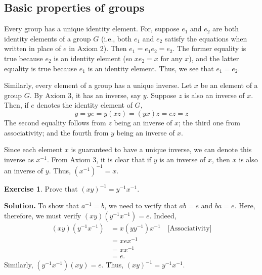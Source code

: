 \documentclass[svgnames]{article}
\theoremstyle{definition}
\newtheorem{Exercise}{Exercise}[section]
\theoremstyle{remark}
\begin{document}
\subsection{Basic properties of groups}\label{subsec:BasicProps}
Every group has a unique identity element. For, suppose $e_1$ and $e_2$ are both identity elements of a group $G$ (i.e., both $e_1$ and $e_2$ satisfy the equations when written in place of $e$ in Axiom 2). Then $e_1 = e_1 e_2 = e_2$. The former equality is true because $e_2$ is an identity element (so $x e_2 = x$ for any $x$), and the latter equality is true because $e_1$ is an identity element. Thus, we see that $e_1 = e_2$.

Similarly, every element of a group has a unique inverse. Let $x$ be an element of a group $G$. By Axiom 3, it has an inverse, say $y$. Suppose $z$ is also an inverse of $x$. Then, if $e$ denotes the identity element of $G$,
\begin{equation*}
y = ye = y(xz) = (yx)z = ez = z
\end{equation*}
The second equality follows from $z$ being an inverse of $x$; the third one from associativity; and the fourth from $y$ being an inverse of $x$.

\label{def:Inverse} Since each element $x$ is guaranteed to have a unique inverse, we can denote this inverse as $x^{-1}$. From Axiom 3, it is clear that if $y$ is an inverse of $x$, then $x$ is also an inverse of $y$. Thus, $(x^{-1})^{-1} = x$.

\begin{Exercise}
Prove that $(xy)^{-1} = y^{-1} x^{-1}$.

\textbf{Solution.} To show that $a^{-1} = b$, we need to verify that $ab = e$ and $ba = e$. Here, therefore, we must verify $(xy)(y^{-1} x^{-1}) = e$. Indeed,
\begin{align*}
(xy)(y^{-1} x^{-1}) & = x(y y^{-1}) x^{-1} \quad \text{[Associativity]}\\
	& = xex^{-1}\\
	& = xx^{-1}\\
	& = e.
\end{align*}
Similarly, $(y^{-1}x^{-1})(xy) = e$. Thus, $(xy)^{-1} = y^{-1}x^{-1}$.
\end{Exercise}
\end{document}
